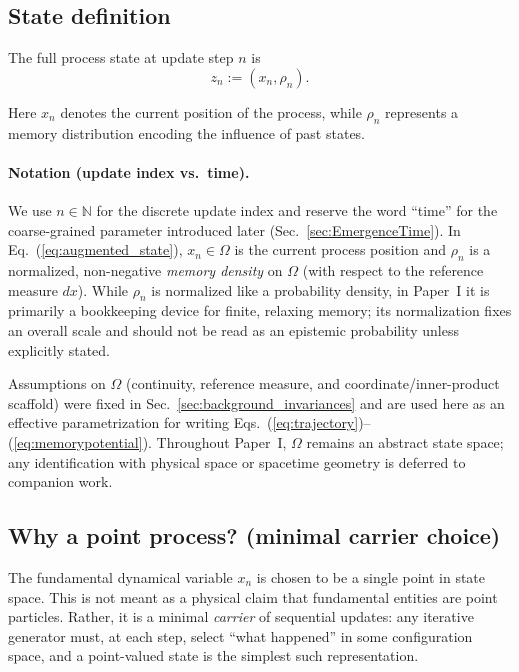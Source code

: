 \documentclass[reprint,amsmath,amssymb,aps,prd,nofootinbib,floatfix]{revtex4-2}
\begin{document}
\subsection{State definition}

The full process state at update step $n$ is
\begin{equation} \label{eq:augmented_state}
z_n := (x_n,\rho_n).
\end{equation}

Here $x_n$ denotes the current position of the process, while $\rho_n$ represents a memory distribution encoding the influence of past states.

\paragraph{Notation (update index vs.\ time).}
We use $n\in\mathbb{N}$ for the discrete update index and reserve the word ``time'' for the coarse-grained parameter introduced later (Sec.~\ref{sec:EmergenceTime}). In Eq.~(\ref{eq:augmented_state}), $x_n\in\Omega$ is the current process position and $\rho_n$ is a normalized, non-negative \emph{memory density} on $\Omega$ (with respect to the reference measure $dx$). While $\rho_n$ is normalized like a probability density, in Paper~I it is primarily a bookkeeping device for finite, relaxing memory; its normalization fixes an overall scale and should not be read as an epistemic probability unless explicitly stated.

Assumptions on $\Omega$ (continuity, reference measure, and coordinate/inner-product scaffold) were fixed in Sec.~\ref{sec:background_invariances} and are used here as an effective parametrization for writing Eqs.~(\ref{eq:trajectory})--(\ref{eq:memorypotential}). Throughout Paper~I, $\Omega$ remains an abstract state space; any identification with physical space or spacetime geometry is deferred to companion work.

\subsection{Why a point process? (minimal carrier choice)}

The fundamental dynamical variable $x_n$ is chosen to be a single point in state space.
This is not meant as a physical claim that fundamental entities are point particles.
Rather, it is a minimal \emph{carrier} of sequential updates: any iterative generator must, at each step, select ``what happened'' in some configuration space, and a point-valued state is the simplest such representation.
\end{document}
